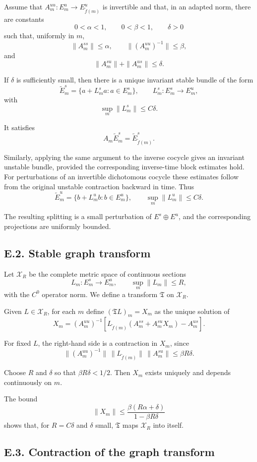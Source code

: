 \documentclass[12pt,a4paper]{article}
\theoremstyle{plain}
\numberwithin{equation}{section}
\numberwithin{theorem}{section}
\begin{document}
Assume that $A_m^{uu}:E_m^u\to E_{\widetilde f(m)}^u$ is invertible and that, in an adapted norm, there are constants
\[
0<\alpha<1,
\qquad
0<\beta<1,
\qquad
\delta>0
\]
such that, uniformly in $m$,
\[
\|A_m^{ss}\|\le\alpha,
\qquad
\|(A_m^{uu})^{-1}\|\le\beta,
\]
and
\[
\|A_m^{su}\|+
\|A_m^{us}\|\le\delta.
\]

If $\delta$ is sufficiently small, then there is a unique invariant stable bundle of the form
\[
\widetilde E_m^s=
\{a+L_m^s a:a\in E_m^s\},
\qquad
L_m^s:E_m^s\to E_m^u,
\]
with
\[
\sup_m\|L_m^s\|\le C\delta.
\]

It satisfies
\[
A_m\widetilde E_m^s=
\widetilde E_{\widetilde f(m)}^s.
\]

Similarly, applying the same argument to the inverse cocycle gives an invariant unstable bundle, provided the corresponding inverse-time block estimates hold. For perturbations of an invertible dichotomous cocycle these estimates follow from the original unstable contraction backward in time. Thus
\[
\widetilde E_m^u=
\{b+L_m^u b:b\in E_m^u\},
\qquad
\sup_m\|L_m^u\|\le C\delta.
\]

The resulting splitting is a small perturbation of $E^s\oplus E^u$, and the corresponding projections are uniformly bounded.

\subsection{E.2. Stable graph transform}

Let $\mathcal X_R$ be the complete metric space of continuous sections
\[
L_m:E_m^s\to E_m^u,
\qquad
\sup_m\|L_m\|\le R,
\]
with the $C^0$ operator norm. We define a transform $\mathfrak T$ on $\mathcal X_R$.

Given $L\in\mathcal X_R$, for each $m$ define $(\mathfrak T L)_m=X_m$ as the unique solution of
\[
X_m
=
(A_m^{uu})^{-1}
\left[
L_{\widetilde f(m)}(A_m^{ss}+A_m^{su}X_m)-A_m^{us}
\right].
\]

For fixed $L$, the right-hand side is a contraction in $X_m$, since
\[
\|(A_m^{uu})^{-1}\|\,
\|L_{\widetilde f(m)}\|\,
\|A_m^{su}\|
\le
\beta R\delta.
\]

Choose $R$ and $\delta$ so that $\beta R\delta<1/2$. Then $X_m$ exists uniquely and depends continuously on $m$.

The bound
\[
\|X_m\|
\le
\frac{\beta(R\alpha+
\delta)}{1-
\beta R\delta}
\]
shows that, for $R=C\delta$ and $\delta$ small, $\mathfrak T$ maps $\mathcal X_R$ into itself.

\subsection{E.3. Contraction of the graph transform}
\end{document}
